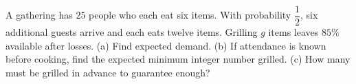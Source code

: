 A gathering has $25$ people who each eat six items. With probability $\dfrac{1}{2}$, six additional guests arrive and each eats twelve items. Grilling $g$ items leaves $85\%$ available after losses. (a) Find expected demand. (b) If attendance is known before cooking, find the expected minimum integer number grilled. (c) How many must be grilled in advance to guarantee enough?

